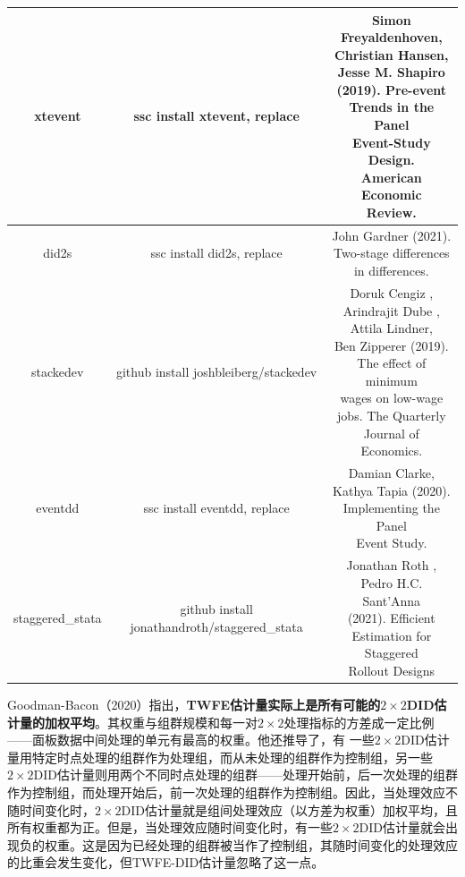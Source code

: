 \documentclass[cn,12pt,math=newtx,citestyle=gb7714-2015,bibstyle=gb7714-2015]{elegantbook}
\makeatletter
\newcommand{\tabincell}[2]{\begin{tabular}{@{}#1@{}}#2\end{tabular}}  %
\makeatother
\begin{document}
\begin{table}[htbp]
\begin{longtable}{|c|c|c|}
			xtevent	& ssc install xtevent, replace&\tabincell{c}{Simon Freyaldenhoven, \\Christian Hansen, \\Jesse M. Shapiro\\ (2019). Pre-event \\Trends in the Panel \\Event-Study Design.\\ American Economic\\ Review.}\\
			\hline
			did2s&	ssc install did2s, replace	& \tabincell{c}{John Gardner (2021). \\Two-stage differences \\in differences.}\\
			\hline
			stackedev &	github install joshbleiberg/stackedev&  \tabincell{c}{Doruk Cengiz , \\Arindrajit Dube , \\Attila Lindner,\\ Ben Zipperer  (2019). \\The effect of minimum \\wages on low-wage\\ jobs. The Quarterly \\Journal of Economics.} \\
			\hline
			
			eventdd	&ssc install eventdd, replace&	 \tabincell{c}{Damian Clarke,\\ Kathya Tapia (2020). \\Implementing the Panel \\Event Study.}\\
			\hline
			staggered\_stata&	github install jonathandroth/staggered\_stata&	 \tabincell{c}{Jonathan Roth , \\Pedro H.C. Sant'Anna  \\(2021). Efficient\\ Estimation for Staggered \\Rollout Designs} \\
			\hline
			
		\end{longtable}
	\end{table}
	
	
	Goodman-Bacon（2020）指出，\textbf{TWFE估计量实际上是所有可能的$2 \times 2$DID估计量的加权平均}。其权重与组群规模和每一对$2 \times 2$处理指标的方差成一定比例——面板数据中间处理的单元有最高的权重。他还推导了，有 一些$2 \times 2$DID估计量用特定时点处理的组群作为处理组，而从未处理的组群作为控制组，另一些$2 \times 2$DID估计量则用两个不同时点处理的组群——处理开始前，后一次处理的组群作为控制组，而处理开始后，前一次处理的组群作为控制组。因此，当处理效应不随时间变化时，$2 \times 2$DID估计量就是组间处理效应（以方差为权重）加权平均，且所有权重都为正。但是，当处理效应随时间变化时，有一些$2 \times 2$DID估计量就会出现负的权重。这是因为已经处理的组群被当作了控制组，其随时间变化的处理效应的比重会发生变化，但TWFE-DID估计量忽略了这一点。
	
\end{document}
